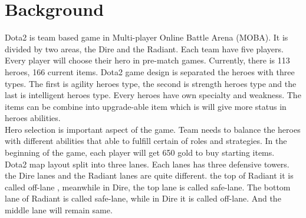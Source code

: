 \section{Background}
\label{sec:background}

Dota2 is team based game in Multi-player Online Battle Arena (MOBA). It is divided by two areas, the Dire and the Radiant. Each team have five players. Every player will choose their hero in pre-match games. Currently, there is 113 heroes, 166 current items. Dota2 game design is separated the heroes with three types. The first is agility heroes type, the second is strength heroes type and the last is intelligent heroes type. Every heroes have own specialty and weakness. The items can be combine into upgrade-able item which is will give more status in heroes abilities.
\\
Hero selection is important aspect of the game. Team needs to balance the heroes with different abilities that able to fulfill certain of roles and strategies. In the beginning of the game, each player will get 650 gold to buy starting items. 
\\
Dota2 map layout split into three lanes. Each lanes has three defensive towers. the Dire lanes and the Radiant lanes are quite different. the top of Radiant it is called off-lane , meanwhile in Dire, the top lane is called safe-lane. The bottom lane of Radiant is called safe-lane, while in Dire it is called off-lane. And the middle lane will remain same.
\\
